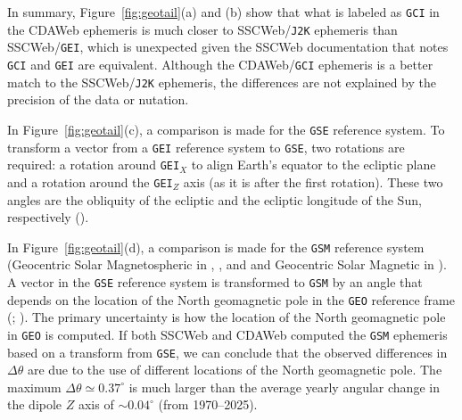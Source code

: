 \documentclass[draft]{agujournal2019}
\begin{document}
In summary, Figure~\ref{fig:geotail}(a) and (b) show that what is labeled as \texttt{GCI} in the CDAWeb ephemeris is much closer to SSCWeb/\texttt{J2K} ephemeris than SSCWeb/\texttt{GEI}, which is unexpected given the SSCWeb documentation that notes \texttt{GCI} and \texttt{GEI} are equivalent. Although the CDAWeb/\texttt{GCI} ephemeris is a better match to the SSCWeb/\texttt{J2K} ephemeris, the differences are not explained by the precision of the data or nutation.

In Figure~\ref{fig:geotail}(c), a comparison is made for the \texttt{GSE} reference system. To transform a vector from a \texttt{GEI} reference system to \texttt{GSE}, two rotations are required: a rotation around \texttt{GEI}$_X$ to align Earth's equator to the ecliptic plane and a rotation around the \texttt{GEI}$_Z$ axis (as it is after the first rotation). These two angles are the obliquity of the ecliptic and the ecliptic longitude of the Sun, respectively ().

In Figure~\ref{fig:geotail}(d), a comparison is made for the \texttt{GSM} reference system (Geocentric Solar Magnetospheric in , , and  and Geocentric Solar Magnetic in ). A vector in the \texttt{GSE} reference system is transformed to \texttt{GSM} by an angle that depends on the location of the North geomagnetic pole in the \texttt{GEO} reference frame (; ). The primary uncertainty is how the location of the North geomagnetic pole in \texttt{GEO} is computed. If both SSCWeb and CDAWeb computed the \texttt{GSM} ephemeris based on a transform from \texttt{GSE}, we can conclude that the observed differences in $\Delta \theta$ are due to the use of different locations of the North geomagnetic pole. The maximum $\Delta \theta \simeq 0.37^\circ$ is much larger than the average yearly angular change in the dipole $Z$ axis of $\sim 0.04^\circ$ (from 1970--2025).


\end{document}
